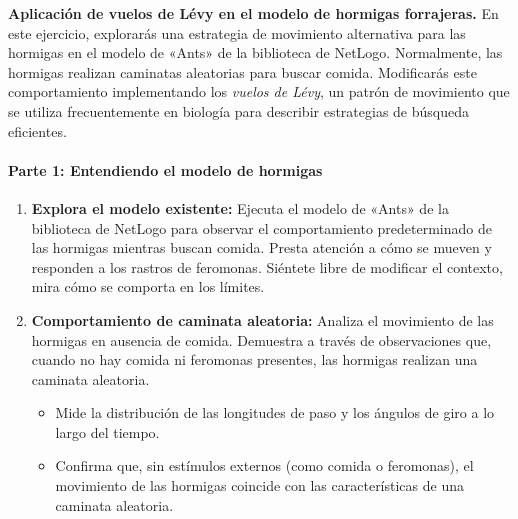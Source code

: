 \setcounter{ejercicio}{5}   %
\begin{ejercicio}[Tipo 2]\label{ej:levy}
\textbf{Aplicación de vuelos de Lévy en el modelo de hormigas forrajeras.}
En este ejercicio, explorarás una estrategia de movimiento alternativa para las
hormigas en el modelo de «Ants» de la biblioteca de NetLogo. Normalmente, las
hormigas realizan caminatas aleatorias para buscar comida. Modificarás este
comportamiento implementando los \emph{vuelos de Lévy}, un patrón de movimiento
que se utiliza frecuentemente en biología para describir estrategias de búsqueda
eficientes.

\paragraph{Parte 1: Entendiendo el modelo de hormigas}
\begin{enumerate}
  \item \textbf{Explora el modelo existente:} Ejecuta el modelo de «Ants» de la
    biblioteca de NetLogo para observar el comportamiento predeterminado de las
    hormigas mientras buscan comida. Presta atención a cómo se mueven y
    responden a los rastros de feromonas. Siéntete libre de modificar el
    contexto, mira cómo se comporta en los límites.
  \item \textbf{Comportamiento de caminata aleatoria:} Analiza el movimiento de
    las hormigas en ausencia de comida. Demuestra a través de observaciones que,
    cuando no hay comida ni feromonas presentes, las hormigas realizan una
    caminata aleatoria.
    \begin{itemize}
      \item Mide la distribución de las longitudes de paso y los ángulos de giro
        a lo largo del tiempo.
      \item Confirma que, sin estímulos externos (como comida o feromonas), el
        movimiento de las hormigas coincide con las características de una
        caminata aleatoria.
    \end{itemize}
\end{enumerate}


\end{ejercicio}
